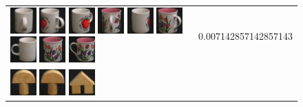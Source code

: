 \begin{figure}[!bp]
\begin{tabular}{m{11cm} | m{3cm} |}
\includegraphics[width=1cm]{coil/beeld-41.eps}
\includegraphics[width=1cm]{coil/beeld-40.eps}
\includegraphics[width=1cm]{coil/beeld-39.eps}
\includegraphics[width=1cm]{coil/beeld-11.eps}
\includegraphics[width=1cm]{coil/beeld-38.eps}
\includegraphics[width=1cm]{coil/beeld-10.eps}
\includegraphics[width=1cm]{coil/beeld-37.eps}
\includegraphics[width=1cm]{coil/beeld-8.eps}
\includegraphics[width=1cm]{coil/beeld-7.eps}
& {\scriptsize 0.007142857142857143}
\\
\includegraphics[width=1cm]{coil/beeld-0.eps}
\includegraphics[width=1cm]{coil/beeld-1.eps}
\includegraphics[width=1cm]{coil/beeld-42.eps}

\end{tabular}
\end{figure}

